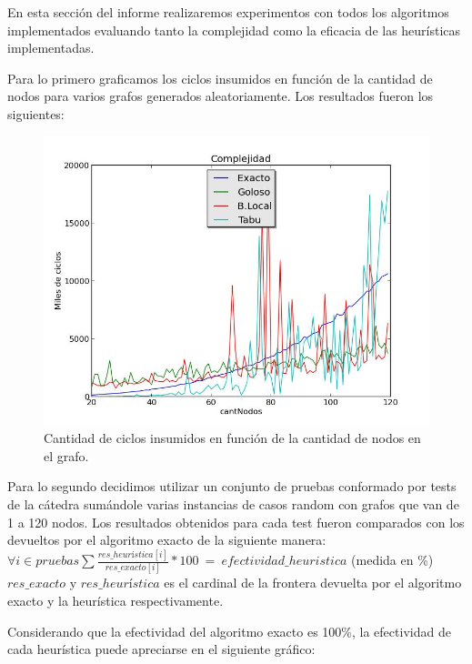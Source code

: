 En esta sección del informe realizaremos experimentos con todos los algoritmos implementados evaluando tanto la complejidad como la eficacia de las heurísticas implementadas.

Para lo primero graficamos los ciclos insumidos en función de la cantidad de nodos para varios grafos generados aleatoriamente. Los resultados fueron los siguientes:

\begin{figure}[H]
\centering\includegraphics[width=11 cm]{experimentacion/complejidad.jpg}
\caption{Cantidad de ciclos insumidos en función de la cantidad de nodos en el grafo.}
\end{figure}

Para lo segundo decidimos utilizar un conjunto de pruebas conformado por tests de la cátedra sumándole varias instancias de casos random con grafos que van de 1 a 120 nodos. Los resultados obtenidos para cada test fueron comparados con los devueltos por el algoritmo exacto de la siguiente manera: \\

$\forall i \in pruebas \sum{\frac{res\_heurística[i]}{res\_exacto[i]}} * 100 \ = \ efectividad\_heuristica$ (medida en \%)
$res\_exacto$ y $res\_heurística$ es el cardinal de la frontera devuelta por el algoritmo exacto y la heurística respectivamente.

Considerando que la efectividad del algoritmo exacto es 100$\%$, la efectividad de cada heurística puede apreciarse en el siguiente gráfico:

